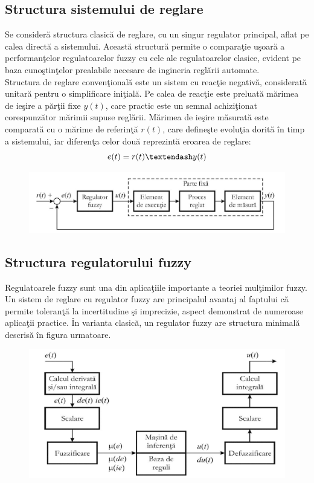\documentclass[11pt]{article}
\newcommand{\EqRow}{\vspace{1.5mm}}
\begin{document}
\subsection{Structura sistemului de reglare}
Se consideră structura clasică de reglare, cu un singur regulator principal, aflat pe calea directă a sistemului. Această structură permite o comparaţie uşoară a performanţelor regulatoarelor fuzzy cu cele ale regulatoarelor clasice, evident pe baza cunoştinţelor prealabile necesare de ingineria reglării automate.\\
Structura de reglare convenţională este un sistem cu reacţie negativă, considerată unitară pentru o simplificare iniţială. Pe calea de reacţie este preluată mărimea de ieşire a părţii fixe $y(t)$, care practic este un semnal achiziţionat corespunzător mărimii supuse reglării. Mărimea de ieşire măsurată este comparată cu o mărime de referinţă $r(t)$, care defineşte evoluţia dorită în timp a sistemului, iar diferenţa celor două reprezintă eroarea de reglare:\\
\begin{equation} 
e(t) = r(t) – y(t)
\EqRow
\end{equation}
\begin{figure}[H]
	\centering
	\includegraphics[width=0.7\linewidth]{struct_reg.png}
	\label{fig:test2}
\end{figure}

\subsection{Structura regulatorului fuzzy}
Regulatoarele fuzzy sunt una din aplicaţiile importante a teoriei mulţimilor fuzzy. Un sistem de reglare cu regulator fuzzy are principalul avantaj al faptului că permite toleranţă la incertitudine şi imprecizie, aspect demonstrat de numeroase aplicaţii practice.
În varianta clasică, un regulator fuzzy are structura minimală descrisă în figura urmatoare.
\begin{figure}[H]
	\centering
	\includegraphics[width=0.5\linewidth]{struct_reg_teorie.png}
	\label{fig:test2}
\end{figure}
\newpage
\end{document}
